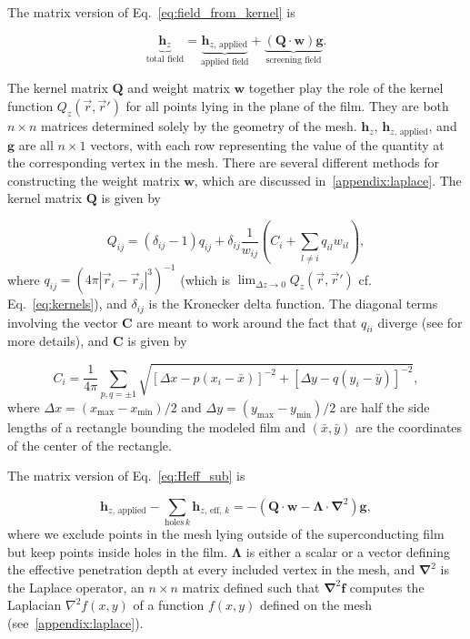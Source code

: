 \documentclass[final,3p,times]{elsarticle}
\newcounter{bla}
\begin{document}
The matrix version of Eq.~\ref{eq:field_from_kernel} is

\begin{equation}
    \label{eq:field_from_kernel_num}
    \underbrace{\mathbf{h}_z}_\text{total field}
    = \underbrace{\mathbf{h}_{z,\,\mathrm{applied}}}_\text{applied field}
    + \underbrace{(\mathbf{Q}\cdot\mathbf{w})\mathbf{g}}_\text{screening field}.
\end{equation}

The kernel matrix $\mathbf{Q}$ and weight matrix $\mathbf{w}$ together play the role of the
kernel function $Q_z(\vec{r},\vec{r}')$ for all points lying in the plane of the film. They are both $n\times n$ matrices determined solely by the geometry of the mesh.
$\mathbf{h}_z$, $\mathbf{h}_{z,\,\mathrm{applied}}$, and $\mathbf{g}$ are all $n\times 1$ vectors, with each row representing the value of the quantity at the
corresponding vertex in the mesh. There are several different methods for constructing the weight matrix $\mathbf{w}$, which are discussed in~\ref{appendix:laplace}. The kernel matrix $\mathbf{Q}$ is given by

\begin{equation}
    \label{eq:kernel_matrix}
    Q_{ij} = (\delta_{ij}-1)q_{ij}
    + \delta_{ij}\frac{1}{w_{ij}}\left(C_i + \sum_{l\neq i}q_{il}w_{il}\right),
\end{equation}
where $q_{ij} = \left(4\pi|\vec{r}_i-\vec{r}_j|^3\right)^{-1}$
(which is $\lim_{\Delta z\to 0}Q_z(\vec{r},\vec{r}')$ cf. Eq.~\ref{eq:kernels}),
and $\delta_{ij}$ is the Kronecker delta function. The diagonal terms involving the vector $\mathbf{C}$ are meant to work around the fact that $q_{ii}$ diverge (see \cite{brandt_thin_2005} for more details), and $\mathbf{C}$ is given by

\begin{equation}
    \label{eq:C_vector}
    C_i = \frac{1}{4\pi}\sum_{p,q=\pm1}\sqrt{[\Delta x - p(x_i-\bar{x})]^{-2} + [\Delta y - q(y_i-\bar{y})]^{-2}},
\end{equation}
where $\Delta x=(x_\mathrm{max}-x_\mathrm{min})/2$ and $\Delta y=(y_\mathrm{max}-y_\mathrm{min})/2$ are half the side lengths of a rectangle bounding the modeled film and $(\bar{x}, \bar{y})$ are the coordinates of the center of the rectangle.

The matrix version of Eq.~\ref{eq:Heff_sub} is

\begin{equation}
    \label{eq:Heff_sub_num}
     \mathbf{h}_{z,\,\mathrm{applied}} - \sum_{\mathrm{holes}\, k}\mathbf{h}_{z,\,\mathrm{eff},\,k} = -(\mathbf{Q}\cdot\mathbf{w}-\mathbf{\Lambda}\cdot\mathbf{\nabla}^2)\mathbf{g},
\end{equation}
where we exclude points in the mesh lying outside of the superconducting film but keep points
inside holes in the film. $\mathbf{\Lambda}$ is either a scalar or a vector defining the effective penetration depth at every included vertex in the mesh, and $\mathbf{\nabla}^2$
is the Laplace operator, an $n\times n$ matrix defined such that $\mathbf{\nabla}^2\mathbf{f}$ computes the Laplacian $\nabla^2f(x,y)$ of a function $f(x,y)$ defined on the mesh  (see~\ref{appendix:laplace}).
\end{document}
